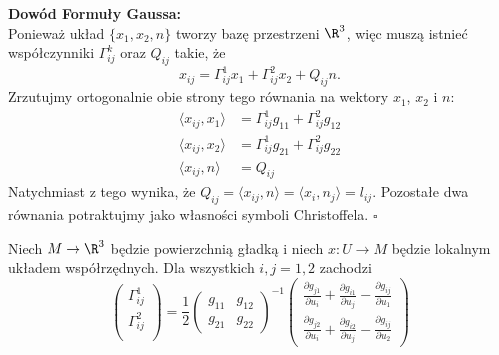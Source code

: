 \begin{frame}
\textcolor{ared}{\textbf{Dowód Formuły Gaussa: }}\\\pause
Ponieważ układ $\{x_1, x_2, n\}$ tworzy bazę przestrzeni $\R^3$, więc muszą istnieć współczynniki $\Gamma^k_{ij}$ oraz $Q_{ij}$ takie, że \[x_{ij}=\Gamma^1_{ij}x_1+\Gamma^2_{ij}x_2+Q_{ij}n.\]\pause
Zrzutujmy ortogonalnie obie strony tego równania na wektory $x_1$, $x_2$ i $n$:
\begin{align*}
\langle x_{ij},x_1 \rangle&=\Gamma^1_{ij}g_{11}+\Gamma^2_{ij}g_{12}\\
\langle x_{ij}, x_2\rangle&=\Gamma^1_{ij}g_{21}+\Gamma^2_{ij}g_{22}\\
\langle x_{ij}, n\rangle&=Q_{ij}
\end{align*}
\pause Natychmiast z tego wynika, że $Q_{ij}=\langle x_{ij}, n\rangle=\langle x_i , n_j \rangle = l_{ij}$. Pozostałe dwa równania potraktujmy jako własności symboli Christoffela.
\hfill $\square$
\end{frame}
\begin{frame}[<+->]
\begin{lemat}\label{lem:christoffel-prop}
Niech $M\to \R^3$ będzie powierzchnią gładką i niech $x\colon U\to M$ będzie lokalnym układem współrzędnych. Dla wszystkich $i, j=1,2$ zachodzi
\[
\left(
\begin{array}{c}
\Gamma^1_{ij}\\
\Gamma^2_{ij}\\
\end{array}
\right)
=\frac{1}{2}\left(
\begin{array}{cc}
g_{11} & g_{12}\\
g_{21} & g_{22}
\end{array}
\right)^{-1}
\left(
\begin{array}{c}
\frac{\partial g_{j1}}{\partial u_i}+\frac{\partial g_{i1}}{\partial u_j}-\frac{\partial g_{ij}}{\partial u_1}\\
\frac{\partial g_{j2}}{\partial u_i}+\frac{\partial g_{i2}}{\partial u_j}-\frac{\partial g_{ij}}{\partial u_2}
\end{array}
\right)
\]
\end{lemat}
\end{frame}
